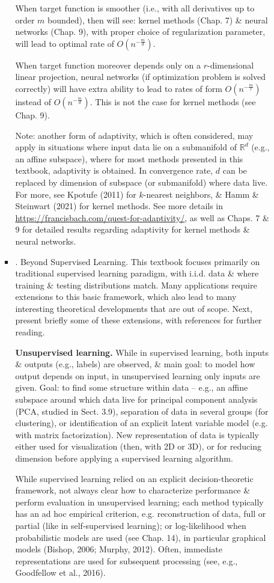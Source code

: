 \documentclass{article}
\begin{document}
\begin{enumerate}
\begin{itemize}
\begin{itemize}
			When target function is smoother (i.e., with all derivatives up to order $m$ bounded), then will see: kernel methods (Chap. 7) \& neural networks (Chap. 9), with proper choice of regularization parameter, will lead to optimal rate of $O(n^{-\frac{m}{d}})$.
			
			When target function moreover depends only on a $r$-dimensional linear projection, neural networks (if optimization problem is solved correctly) will have extra ability to lead to rates of form $O(n^{-\frac{m}{r}})$ instead of $O(n^{-\frac{m}{d}})$. This is not the case for kernel methods (see Chap. 9).
			
			Note: another form of adaptivity, which is often considered, may apply in situations where input data lie on a submanifold of $\mathbb{R}^d$ (e.g., an affine subspace), where for most methods presented in this textbook, adaptivity is obtained. In convergence rate, $d$ can be replaced by dimension of subspace (or submanifold) where data live. For more, see Kpotufe (2011) for $k$-nearest neighbors, \& Hamm \& Steinwart (2021) for kernel methods. See more details in \url{https://francisbach.com/quest-for-adaptivity/}, as well as Chaps. 7 \& 9 for detailed results regarding adaptivity for kernel methods \& neural networks.
			\item {. Beyond Supervised Learning.} This textbook focuses primarily on traditional supervised learning paradigm, with i.i.d. data \& where training \& testing distributions match. Many applications require extensions to this basic framework, which also lead to many interesting theoretical developments that are out of scope. Next, present briefly some of these extensions, with references for further reading.
			
			{\bf Unsupervised learning.} While in supervised learning, both inputs \& outputs (e.g., labels) are observed, \& main goal: to model how output depends on input, in unsupervised learning only inputs are given. Goal: to find some structure within data -- e.g., an affine subspace around which data live for principal component analysis (PCA, studied in Sect. 3.9), separation of data in several groups (for clustering), or identification of an explicit latent variable model (e.g. with matrix factorization). New representation of data is typically either used for visualization (then, with 2D or 3D), or for reducing dimension before applying a supervised learning algorithm.
			
			While supervised learning relied on an explicit decision-theoretic framework, not always clear how to characterize performance \& perform evaluation in unsupervised learning; each method typically has an ad hoc empirical criterion, e.g. reconstruction of data, full or partial (like in self-supervised learning); or log-likelihood when probabilistic models are used (see Chap. 14), in particular graphical models (Bishop, 2006; Murphy, 2012). Often, immediate representations are used for subsequent processing (see, e.g., Goodfellow et al., 2016).
			

\end{itemize}
\end{itemize}
\end{enumerate}
\end{document}
